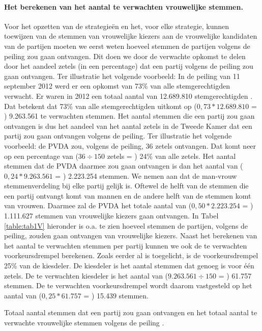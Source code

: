 \paragraph{Het berekenen van het aantal te verwachten vrouwelijke stemmen.}
Voor het opzetten van de strategie\"{e}n en het, voor elke strategie, kunnen toewijzen van de stemmen van vrouwelijke kiezers aan de vrouwelijke kandidaten van de partijen moeten we eerst weten hoeveel stemmen de partijen volgens de peiling zou gaan ontvangen. Dit doen we door de verwachte opkomst te delen door het aandeel zetels (in een percentage) dat een partij volgens de peiling zou gaan ontvangen. Ter illustratie het volgende voorbeeld: In de peiling van 11 september 2012 \citep{IPSOS} werd er een opkomst van 73\% van alle stemgerechtigden verwacht. Er waren in 2012 een totaal aantal van 12.689.810 stemgerechtigden \citep{Kiesraad_uitslag}. Dat betekent dat 73\% van alle stemgerechtigden uitkomt op ($0,73*12.689.810$ = ) 9.263.561 te verwachten stemmen. Het aantal stemmen die een partij zou gaan ontvangen is dus het aandeel van het aantal zetels in de Tweede Kamer dat een partij zou gaan ontvangen volgens de peiling. Ter illustratie het volgende voorbeeld: de PVDA  zou, volgens de peiling,  36 zetels ontvangen. Dat komt neer op een percentage van ($36\div150$ zetels = ) 24\% van alle zetels. Het aantal stemmen dat de PVDA daarmee zou gaan ontvangen is dan het aantal van ($0,24*9.263.561$ = ) 2.223.254 stemmen. We nemen aan dat de man-vrouw stemmenverdeling bij elke partij gelijk is. Oftewel de helft van de stemmen die een partij ontvangt komt van mannen en de andere helft van de stemmen komt van vrouwen. Daarmee zal de PVDA het totale aantal van ($0,50*2.223.254$ = ) 1.111.627 stemmen van vrouwelijke kiezers gaan ontvangen. In Tabel \ref{table:tab1V} hieronder is o.a. te zien hoeveel stemmen de partijen, volgens de peiling, zouden gaan ontvangen van vrouwelijke kiezers. Naast het berekenen van het aantal te verwachten stemmen per partij kunnen we ook de te verwachten voorkeursdrempel berekenen. Zoals eerder al is toegelicht, is de voorkeursdrempel 25\% van de kiesdeler. De kiesdeler is het aantal stemmen dat genoeg is voor één zetels. De te verwachten kiesdeler is het aantal van ($9.263.561\div150$ = ) 61.757 stemmen. De te verwachten voorkeursdrempel wordt daarom vastgesteld op het aantal van ($0,25*61.757$ = ) 15.439 stemmen.






\begin{table}[h]
\centering
	\begin{footnotesize}
		
	\end{footnotesize}
			\caption{Totaal aantal stemmen dat een partij zou gaan ontvangen en het totaal aantal te verwachte vrouwelijke stemmen volgens de peiling \citep{IPSOS}.}
\label{table:tab1V} 
\end{table}

